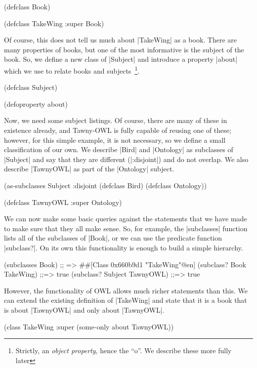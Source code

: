 \begin{tawny}
(defclass Book)

(defclass TakeWing
  :super Book)
\end{tawny}

Of course, this does not tell us much about |TakeWing| as a book. There are
many properties of books, but one of the most informative is the subject of
the book. So, we define a new class of |Subject| and introduce a property
|about| which we use to relate books and subjects~\footnote{Strictly, an
  \emph{object property}, hence the ``o''. We describe these more fully
  later}.

\begin{tawny}
(defclass Subject)

(defoproperty about)
\end{tawny}

Now, we need some subject listings. Of course, there are many of these in
existence already, and Tawny-OWL is fully capable of reusing one of these;
however, for this simple example, it is not necessary, so we define a small
classification of our own. We describe |Bird| and |Ontology| as subclasses of
|Subject| and say that they are different (|:disjoint|) and do not overlap. We
also describe |TawnyOWL| as part of the |Ontology| subject.

\begin{tawny}
(as-subclasses
 Subject
 :disjoint
 (defclass Bird)
 (defclass Ontology))

(defclass TawnyOWL
  :super Ontology)
\end{tawny}

We can now make some basic queries against the statements that we have made to
make sure that they all make sense. So, for example, the |subclasses| function
lists all of the subclasses of |Book|, or we can use the predicate function
|subclass?|. On its own this functionality is enough to build a simple
hierarchy.

\begin{tawny}
(subclasses Book)
;; => #{#[Class 0x660b9d1 "TakeWing"@en]}
(subclass? Book TakeWing)
;;=> true
(subclass? Subject TawnyOWL)
;;=> true
\end{tawny}

However, the functionality of OWL allows much richer statements than this. We
can extend the existing definition of |TakeWing| and state that it is a book
that is about |TawnyOWL| and only about |TawnyOWL|.

\begin{tawny}
(class
 TakeWing
 :super
 (some-only about TawnyOWL))
\end{tawny}

